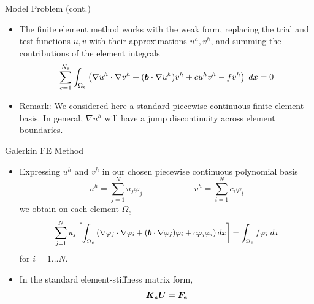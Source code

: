 \begin{frame}{Model Problem (cont.)}
\begin{itemize}
\item The finite element method works with the weak form, replacing the trial and
  test functions $u,v$ with their approximations $u^h, v^h$, and summing the
  contributions of the element integrals
  \gdef\eqneltint{      \sum_{e=1}^{N_e} \int_{\Omega_e}
      \left( \nabla u^h \cdot \nabla v^h + (\bv{b} \cdot \nabla u^h) v^h + cu^h v^h
      -fv^h \right)\;  dx=0}
    \begin{equation}\label{eqn:element_integrals}
      \eqneltint
    \end{equation}

  \item Remark: We considered here a standard piecewise continuous finite element basis.
    In general, $\nabla u^h$ will have a jump discontinuity across element boundaries.
\end{itemize}
\end{frame}



\begin{frame}{Galerkin FE Method}
\begin{itemize}
  \item Expressing $u^h$ and $v^h$ in our chosen piecewise continuous polynomial
    basis
    \begin{equation}
      u^h = \sum_{j=1}^{N} u_j \varphi_j \hspace{1in} v^h = \sum_{i=1}^{N} c_i \varphi_i
    \end{equation}
    we obtain on each element $\Omega_e$
    \begin{equation}
      \small
      \sum_{j=1}^{N} u_j \left[ \int_{\Omega_e} \left( \nabla \varphi_j \cdot \nabla \varphi_i +
      ({\boldsymbol{b}} \cdot \nabla \varphi_j) \varphi_i + c \varphi_j \varphi_i \right) dx \right] =
      \int_{\Omega_e} f \varphi_i \; dx
    \end{equation}
    for $i=1 \ldots N$.

  \item In the standard element-stiffness matrix form,
    \begin{equation}
      {\boldsymbol{K_e}}{\boldsymbol{U}} = {\boldsymbol{F_e}}
    \end{equation}

\end{itemize}
\end{frame}


